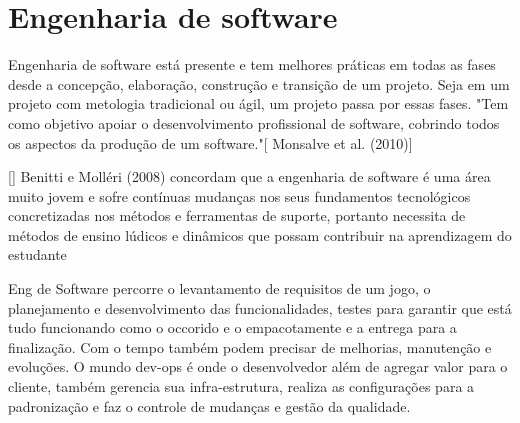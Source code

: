 \section[Engenharia de software]{Engenharia de software}
Engenharia de software está presente e tem melhores práticas em todas as fases desde a concepção, elaboração, construção e transição de um projeto. Seja em um projeto com metologia tradicional ou ágil, um projeto passa por essas fases.
"Tem como objetivo apoiar o desenvolvimento profissional de software, cobrindo todos os aspectos da produção de um software."[\cite{sucessoJogoEngSoft}  Monsalve et al. (2010)]

[\cite{sucessoJogoEngSoft}] Benitti e Molléri (2008) concordam que a engenharia de software é uma área muito jovem e sofre contínuas mudanças nos seus fundamentos tecnológicos concretizadas nos métodos e ferramentas de suporte, portanto necessita de métodos de ensino lúdicos e dinâmicos que possam contribuir na aprendizagem do estudante



Eng de Software percorre o levantamento de requisitos de um jogo, o planejamento e desenvolvimento das funcionalidades, testes para garantir que está tudo funcionando como o occorido e o empacotamente e a entrega para a finalização. Com o tempo também podem precisar de melhorias, manutenção e evoluções. O mundo dev-ops é onde o desenvolvedor além de agregar valor para o cliente, também gerencia sua infra-estrutura, realiza as configurações para a padronização e faz o controle de mudanças e gestão da qualidade.
